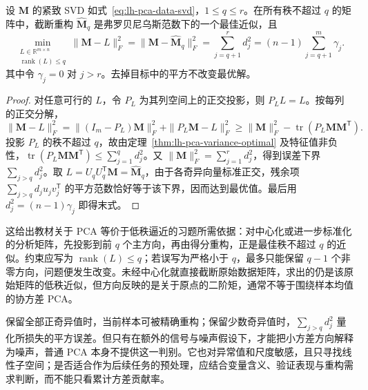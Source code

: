 \begin{theorem}
\label{thm:lh-pca-low-rank}
设 $\mathbf M$ 的紧致 SVD 如式~\eqref{eq:lh-pca-data-svd}，$1\leq q\leq r$。在所有秩不超过 $q$ 的矩阵中，截断重构 $\widehat{\mathbf M}_q$ 是弗罗贝尼乌斯范数下的一个最佳近似，且
\begin{equation}
\min_{\substack{L\in\mathbb R^{m\times n}\\\operatorname{rank}(L)\leq q}}
\|\mathbf M-L\|_F^2
=\|\mathbf M-\widehat{\mathbf M}_q\|_F^2
=\sum_{j=q+1}^r d_j^2
=(n-1)\sum_{j=q+1}^m\gamma_j.
\label{eq:lh-pca-low-rank}
\end{equation}
其中令 $\gamma_j=0$ 对 $j>r$。去掉目标中的平方不改变最优解。
\end{theorem}
\begin{proof}
对任意可行的 $L$，令 $P_L$ 为其列空间上的正交投影，则 $P_LL=L$。按每列的正交分解，
\[
\|\mathbf M-L\|_F^2
=\|(I_m-P_L)\mathbf M\|_F^2
+\|P_L\mathbf M-L\|_F^2
\geq\|\mathbf M\|_F^2-\operatorname{tr}(P_L\mathbf M\mathbf M^{\mathsf T}).
\]
投影 $P_L$ 的秩不超过 $q$，故由定理~\ref{thm:lh-pca-variance-optimal} 及特征值非负性，$\operatorname{tr}(P_L\mathbf M\mathbf M^{\mathsf T})\leq\sum_{j=1}^q d_j^2$。又 $\|\mathbf M\|_F^2=\sum_{j=1}^r d_j^2$，得到误差下界 $\sum_{j>q}d_j^2$。取 $L=U_qU_q^{\mathsf T}\mathbf M=\widehat{\mathbf M}_q$，由于各奇异向量标准正交，残余项 $\sum_{j>q}d_ju_jv_j^{\mathsf T}$ 的平方范数恰好等于该下界，因而达到最优值。最后用 $d_j^2=(n-1)\gamma_j$ 即得末式。
\end{proof}

这给出教材关于 PCA 等价于低秩逼近的习题所需依据：对中心化或进一步标准化的分析矩阵，先投影到前 $q$ 个主方向，再由得分重构，正是最佳秩不超过 $q$ 的近似。约束应写为 $\operatorname{rank}(L)\leq q$；若误写为严格小于 $q$，最多只能保留 $q-1$ 个非零方向，问题便发生改变。未经中心化就直接截断原始数据矩阵，求出的仍是该原始矩阵的低秩近似，但方向反映的是关于原点的二阶矩，通常不等于围绕样本均值的协方差 PCA。

保留全部正奇异值时，当前样本可被精确重构；保留少数奇异值时，$\sum_{j>q}d_j^2$ 量化所损失的平方误差。但只有在额外的信号与噪声假设下，才能把小方差方向解释为噪声，普通 PCA 本身不提供这一判别。它也对异常值和尺度敏感，且只寻找线性子空间；是否适合作为后续任务的预处理，应结合变量含义、验证表现与重构需求判断，而不能只看累计方差贡献率。





